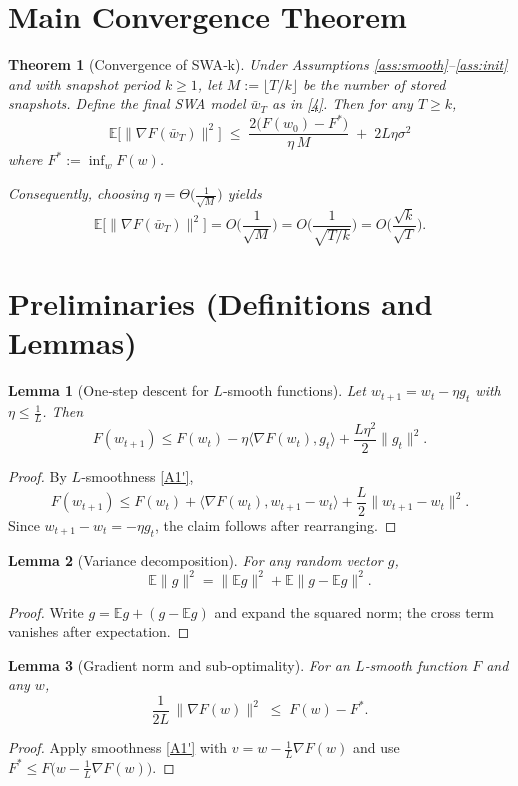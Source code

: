 \documentclass{article}
\newtheorem{theorem}{Theorem}
\newtheorem{lemma}{Lemma}
\begin{document}
\section*{Main Convergence Theorem}
\begin{theorem}[Convergence of SWA‑k]\label{thm:main}
Under Assumptions \ref{ass:smooth}--\ref{ass:init} and with snapshot period $k\ge1$, let $M:=\lfloor T/k\rfloor$ be the number of stored snapshots.  
Define the final SWA model $\bar w_T$ as in \eqref{4}.  
Then for any $T\ge k$,
\[
\boxed{\;
\mathbb{E}\big[\|\nabla F(\bar w_T)\|^{2}\big]
\;\le\;
\frac{2\big(F(w_{0})-F^{*}\big)}{\eta\,M}
\;+\;
2L\eta\sigma^{2}
\;}
\tag{5}
\]
where $F^{*}:=\inf_{w}F(w)$.  

Consequently, choosing $\eta=\Theta\!\big(\frac{1}{\sqrt{M}}\big)$ yields
\[
\mathbb{E}\big[\|\nabla F(\bar w_T)\|^{2}\big]=O\!\Big(\frac{1}{\sqrt{M}}\Big)
=O\!\Big(\frac{1}{\sqrt{T/k}}\Big)=O\!\Big(\frac{\sqrt{k}}{\sqrt{T}}\Big).
\]
\end{theorem}

\section*{Preliminaries (Definitions and Lemmas)}
\begin{lemma}[One‑step descent for $L$‑smooth functions]\label{lem:descent}
Let $w_{t+1}=w_t-\eta g_t$ with $\eta\le\frac{1}{L}$. Then
\[
F(w_{t+1})\le F(w_t)-\eta\langle\nabla F(w_t),g_t\rangle
+\frac{L\eta^{2}}{2}\|g_t\|^{2}.
\tag{L1}
\]
\end{lemma}
\begin{proof}
By $L$‑smoothness \eqref{A1'},
\[
F(w_{t+1})\le F(w_t)+\langle\nabla F(w_t),w_{t+1}-w_t\rangle
+\frac{L}{2}\|w_{t+1}-w_t\|^{2}.
\]
Since $w_{t+1}-w_t=-\eta g_t$, the claim follows after rearranging.
\end{proof}

\begin{lemma}[Variance decomposition]\label{lem:var}
For any random vector $g$,
\[
\mathbb{E}\|g\|^{2}= \|\mathbb{E}g\|^{2}+ \mathbb{E}\|g-\mathbb{E}g\|^{2}.
\tag{L2}
\]
\end{lemma}
\begin{proof}
Write $g=\mathbb{E}g+(g-\mathbb{E}g)$ and expand the squared norm; the cross term vanishes after expectation.
\end{proof}

\begin{lemma}[Gradient norm and sub‑optimality]\label{lem:grad-subopt}
For an $L$‑smooth function $F$ and any $w$,
\[
\frac{1}{2L}\,\|\nabla F(w)\|^{2}\;\le\;F(w)-F^{*}.
\tag{L3}
\]
\end{lemma}
\begin{proof}
Apply smoothness \eqref{A1'} with $v=w-\frac{1}{L}\nabla F(w)$ and use $F^{*}\le F\big(w-\frac{1}{L}\nabla F(w)\big)$.
\end{proof}
\end{document}

